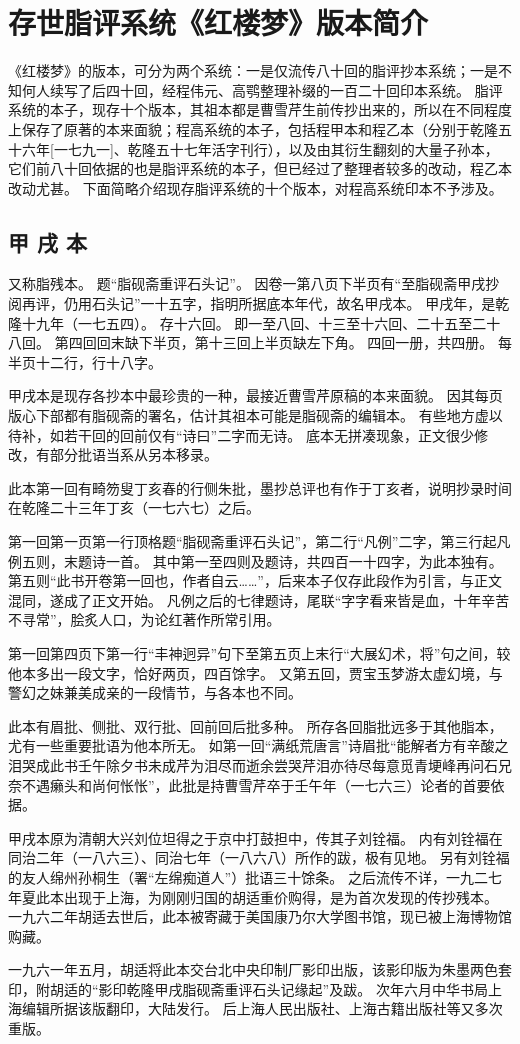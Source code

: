 \chapter{存世脂评系统《红楼梦》版本简介}
《红楼梦》的版本，可分为两个系统：一是仅流传八十回的脂评抄本系统；一是不知何人续写了后四十回，经程伟元、高鹗整理补缀的一百二十回印本系统。
脂评系统的本子，现存十个版本，其祖本都是曹雪芹生前传抄出来的，所以在不同程度上保存了原著的本来面貌；程高系统的本子，包括程甲本和程乙本（分别于乾隆五十六年[一七九一]、乾隆五十七年活字刊行），以及由其衍生翻刻的大量子孙本，它们前八十回依据的也是脂评系统的本子，但已经过了整理者较多的改动，程乙本改动尤甚。
下面简略介绍现存脂评系统的十个版本，对程高系统印本不予涉及。
\par
\section*{甲 戌 本}
又称脂残本。
题“脂砚斋重评石头记”。
因卷一第八页下半页有“至脂砚斋甲戌抄阅再评，仍用石头记”一十五字，指明所据底本年代，故名甲戌本。
甲戌年，是乾隆十九年（一七五四）。
存十六回。
即一至八回、十三至十六回、二十五至二十八回。
第四回回末缺下半页，第十三回上半页缺左下角。
四回一册，共四册。
每半页十二行，行十八字。
\par
甲戌本是现存各抄本中最珍贵的一种，最接近曹雪芹原稿的本来面貌。
因其每页版心下部都有脂砚斋的署名，估计其祖本可能是脂砚斋的编辑本。
有些地方虚以待补，如若干回的回前仅有“诗曰”二字而无诗。
底本无拼凑现象，正文很少修改，有部分批语当系从另本移录。
\par
此本第一回有畸笏叟丁亥春的行侧朱批，墨抄总评也有作于丁亥者，说明抄录时间在乾隆二十三年丁亥（一七六七）之后。
\par
第一回第一页第一行顶格题“脂砚斋重评石头记”，第二行“凡例”二字，第三行起凡例五则，末题诗一首。
其中第一至四则及题诗，共四百一十四字，为此本独有。
第五则“此书开卷第一回也，作者自云……”，后来本子仅存此段作为引言，与正文混同，遂成了正文开始。
凡例之后的七律题诗，尾联“字字看来皆是血，十年辛苦不寻常”，脍炙人口，为论红著作所常引用。
\par
第一回第四页下第一行“丰神迥异”句下至第五页上末行“大展幻术，将”句之间，较他本多出一段文字，恰好两页，四百馀字。
又第五回，贾宝玉梦游太虚幻境，与警幻之妹兼美成亲的一段情节，与各本也不同。
\par
此本有眉批、侧批、双行批、回前回后批多种。
所存各回脂批远多于其他脂本，尤有一些重要批语为他本所无。
如第一回“满纸荒唐言”诗眉批“能解者方有辛酸之泪哭成此书壬午除夕书未成芹为泪尽而逝余尝哭芹泪亦待尽每意觅青埂峰再问石兄奈不遇癞头和尚何怅怅”，此批是持曹雪芹卒于壬午年（一七六三）论者的首要依据。
\par
甲戌本原为清朝大兴刘位坦得之于京中打鼓担中，传其子刘铨福。
内有刘铨福在同治二年（一八六三）、同治七年（一八六八）所作的跋，极有见地。
另有刘铨福的友人绵州孙桐生（署“左绵痴道人”）批语三十馀条。
之后流传不详，一九二七年夏此本出现于上海，为刚刚归国的胡适重价购得，是为首次发现的传抄残本。
一九六二年胡适去世后，此本被寄藏于美国康乃尔大学图书馆，现已被上海博物馆购藏。
\par
一九六一年五月，胡适将此本交台北中央印制厂影印出版，该影印版为朱墨两色套印，附胡适的“影印乾隆甲戌脂砚斋重评石头记缘起”及跋。
次年六月中华书局上海编辑所据该版翻印，大陆发行。
后上海人民出版社、上海古籍出版社等又多次重版。
\par
